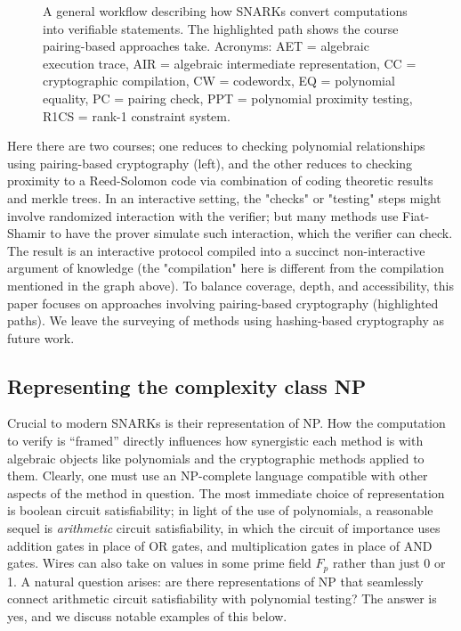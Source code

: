 \begin{figure}[htbp]
    \caption{A general workflow describing how SNARKs convert computations into verifiable statements. The highlighted path shows the course pairing-based approaches take. Acronyms: AET = algebraic execution trace, AIR = algebraic intermediate representation, CC = cryptographic compilation, CW = codewordx, EQ = polynomial equality, PC = pairing check, PPT = polynomial proximity testing, R1CS = rank-1 constraint system.}
    \label{fig:snark-workflow}
\end{figure}
\noindent Here there are two courses; one reduces to checking polynomial relationships using pairing-based cryptography (left), and the other reduces to checking proximity to a Reed-Solomon code via combination of coding theoretic results and merkle trees. In an interactive setting, the "checks" or "testing" steps might involve randomized interaction with the verifier; but many methods use Fiat-Shamir to have the prover simulate such interaction, which the verifier can check. The result is an interactive protocol compiled into a succinct non-interactive argument of knowledge (the "compilation" here is different from the compilation mentioned in the graph above). To balance coverage, depth, and accessibility, this paper focuses on approaches involving pairing-based cryptography (highlighted paths). We leave the surveying of methods using hashing-based cryptography as future work.

\subsection{Representing the complexity class NP}
\noindent Crucial to modern SNARKs is their representation of NP. How the computation to verify is ``framed'' directly influences how synergistic each method is with algebraic objects like polynomials and the cryptographic methods applied to them. Clearly, one must use an NP-complete language compatible with other aspects of the method in question. The most immediate choice of representation is boolean circuit satisfiability; in light of the use of polynomials, a reasonable sequel is \textit{arithmetic} circuit satisfiability, in which the circuit of importance uses addition gates in place of OR gates, and multiplication gates in place of AND gates. Wires can also take on values in some prime field $F_p$  rather than just 0 or 1. A natural question arises: are there representations of NP that seamlessly connect arithmetic circuit satisfiability with polynomial testing? The answer is yes, and we discuss notable examples of this below.

